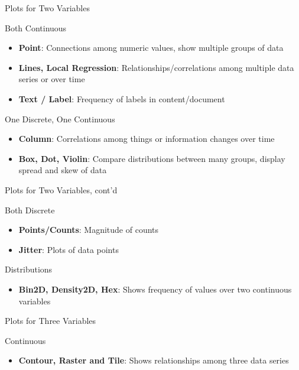 \documentclass[ignorenonframetext,xcolor=x11names]{beamer}
\begin{document}
\begin{frame}{Plots for Two Variables}
\begin{block}{Both Continuous}
\begin{itemize}
  \item {\bf Point}: Connections among numeric values, show multiple groups of data
  \item {\bf Lines, Local Regression}: Relationships/correlations among multiple data series or over time
  \item {\bf Text / Label}: Frequency of labels in content/document
\end{itemize}
\end{block}

\begin{block}{One Discrete, One Continuous}
\begin{itemize}
  \item {\bf Column}: Correlations among things or information changes over time
  \item {\bf Box, Dot, Violin}: Compare distributions between many groups, display spread and skew of data
\end{itemize}
\end{block}
\end{frame}

\begin{frame}{Plots for Two Variables, cont'd}
	\begin{block}{Both Discrete}
		\begin{itemize}
			\item {\bf Points/Counts}: Magnitude of counts
			\item {\bf Jitter}: Plots of data points
		\end{itemize}
	\end{block}
	\begin{block}{Distributions}
		\begin{itemize}
			\item {\bf Bin2D, Density2D, Hex}: Shows frequency of values over two continuous variables
		\end{itemize}
	\end{block}
\end{frame}

\begin{frame}{Plots for Three Variables}
	\begin{block}{Continuous}
		\begin{itemize}
			\item {\bf Contour, Raster and Tile}: Shows relationships among three data series
		\end{itemize}
	\end{block}
\end{frame}
\end{document}
